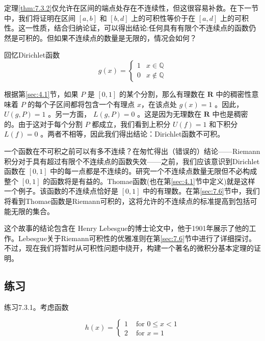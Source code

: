 定理\ref{thm:7.3.2}仅允许在区间的端点处存在不连续性，但这很容易补救。在下一节中，我们将证明在区间 \(\left\lbrack  {a,b}\right\rbrack\) 和 \(\left\lbrack  {b,d}\right\rbrack\) 上的可积性等价于在 \(\left\lbrack  {a,d}\right\rbrack\) 上的可积性。这一性质，结合归纳论证，可以得出结论:任何具有有限个不连续点的函数仍然是可积的。但如果不连续点的数量是无限的，情况会如何？


\begin{Eg}
  回忆Dirichlet函数
\[
g\left( x\right)  = \left\{  \begin{array}{ll} 1 & x\in \mathbb{Q} \\  0 & x\notin \mathbb{Q} \end{array}\right.
\]

根据第\ref{sec:4.1}节，如果 \(P\) 是 \(\left\lbrack  {0,1}\right\rbrack\) 的某个分割，那么有理数在 \(\mathbf{R}\) 中的稠密性意味着 \(P\) 的每个子区间都将包含一个有理点 $x$，在该点处 \(g\left( x\right)  = 1\) 。因此， \(U\left( {g,P}\right)  = 1\) 。另一方面， \(L\left( {g,P}\right)  = 0\) 。这是因为无理数在 \(\mathbf{R}\) 中也是稠密的。由于这对于每个分割 \(P\) 都成立，我们看到上积分 \(U\left( f\right)  = 1\) 和下积分 \(L\left( f\right)  = 0\) 。两者不相等，因此我们得出结论：Dirichlet函数不可积。
\end{Eg}


一个函数在不可积之前可以有多不连续？在匆忙得出（错误的）结论——Riemann积分对于具有超过有限个不连续点的函数失效——之前，我们应该意识到Dirichlet函数在 \(\left\lbrack  {0,1}\right\rbrack\) 中的每一点都是不连续的。研究一个不连续点数量无限但不必构成整个 \(\left\lbrack  {0,1}\right\rbrack\) 的函数将是有益的。Thomae函数(也在第\ref{sec:4.1}节中定义)就是这样一个例子。该函数的不连续点恰好是 \(\left\lbrack  {0,1}\right\rbrack\) 中的有理数。在第\ref{sec:7.6}节中，我们将看到Thomae函数是Riemann可积的，这将允许的不连续点的标准提高到包括可能无限的集合。

这个故事的结论包含在 Henry Lebesgue的博士论文中，他于1901年展示了他的工作。Lebesgue关于Riemann可积性的优雅准则在第\ref{sec:7.6}节中进行了详细探讨。不过，现在我们将暂时从可积性问题中绕开，构建一个著名的微积分基本定理的证明。


\subsection{练习}

练习7.3.1。考虑函数

\[
h\left( x\right)  = \left\{  \begin{array}{ll} 1 & \text{ for }0 \leq  x < 1 \\  2 & \text{ for }x = 1 \end{array}\right.
\]

